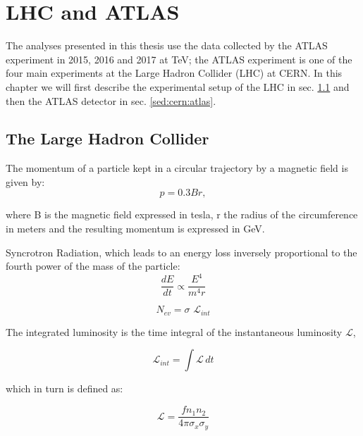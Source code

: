 \chapter{LHC and ATLAS}
\label{chap:cern}

The analyses presented in this thesis use the data collected by the ATLAS experiment in 2015, 2016 and 2017 at \cmtre TeV; the ATLAS experiment is one of the four main experiments at the Large Hadron Collider (LHC) at CERN. In this chapter we will first describe the experimental setup of the LHC in sec. \ref{sed:cern:lhc} and then the ATLAS detector in sec. \ref{sed:cern:atlas}.


\section{The Large Hadron Collider}
\label{sed:cern:lhc}

The momentum of a particle kept in a circular trajectory by a magnetic field is given by:
\begin{equation}
\label{eq:cern:p03br}
p = 0.3 B r,
\end{equation}

\noindent where B is the magnetic field expressed in tesla, r the radius of the circumference in meters and the resulting momentum is expressed in GeV.


Syncrotron Radiation, which leads to an energy loss inversely proportional to the fourth power of the mass of the particle:
\begin{equation}
\label{eq:cern:sync}
\frac{dE}{dt} \propto \frac{E^4}{m^4 r}
\end{equation}


\begin{equation}
\label{eq:cern:nev}
N_{ev} = \sigma \,\, \mathcal{L}_{int}
\end{equation}

The integrated luminosity is the time integral of the instantaneous luminosity $\mathcal{L}$, 

\begin{equation}
\label{eq:cern:intlumi}
\mathcal{L}_{int} = \int \mathcal{L} \, dt
\end{equation}

which in turn is defined as:

\begin{equation}
\label{eq:cern:lumi}
\mathcal{L}=\frac{f n_1 n_2}{4 \pi \sigma_x \sigma_y}
\end{equation}


